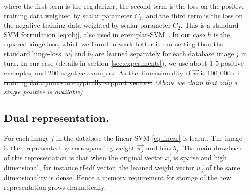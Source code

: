       \noindent
      where the first term is the regularizer, the second term is the loss on the positive training data weighted by scalar parameter $C_1$, and the third term is the loss on the negative training data weighted by scalar parameter $C_2$.   
      This is a standard SVM formulation \eqref{eq:obj}, also used in exemplar-SVM~\cite{Malisiewicz11}.
      In our case $h$ is the squared hinge loss, which we found to work better in our setting than the standard hinge-loss. $\vec{w_j}$ and $b_j$ are learned separately for each database image $j$ in turn. 
      \sout{
      In our case (details in section~\ref{sec:experiments}), we use about 1-5 positive examples, and 200 negative examples. As the dimensionality of $\vec{w}$ is $100,000$ all training data points are typically support vectors. 
      }
      \textcolor{myGrey}{
        \emph{(Above we claim that only a single positive is available)}
      }
      

  \subsection{Dual representation.}
      For each image $j$ in the database the linear SVM \eqref{eq:linear} is learnt. The image is then represented by corresponding weight $\vec{w_j}$ and bias $b_j$. The main drawback of this representation is that when the original vector $\vec{x_j}$ is sparse and high dimensional, for instance tf-idf vector, the learned weight vector $\vec{w_j}$ of the same dimensionality is dense. Hence a memory requirement for storage of the new representation grows dramatically.

